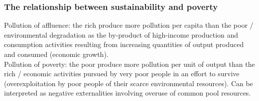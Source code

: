 \subsubsection*{The relationship between sustainability and poverty}
Pollution of affluence: the rich produce more pollution per capita than the poor / environmental degradation as the by-product of high-income production and consumption activities resulting from increasing quantities of output produced and consumed (economic growth).\\
Pollution of poverty: the poor produce more pollution per unit of output than the rich / economic activities pursued by very poor people in an effort to survive (overexploitation by poor people of their scarce environmental resources). Can be interpreted as negative externalities involving overuse of common pool resources.\\
